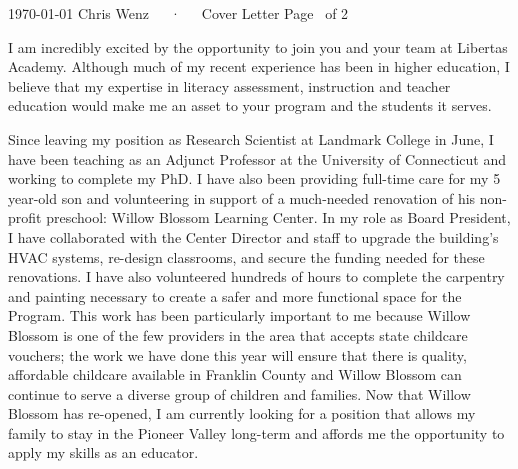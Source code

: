 \documentclass[11pt, a4paper]{awesome-cv}
\begin{document}
\makecvheader[C]

\makecvfooter
  {\today}
  {Chris Wenz~~~·~~~Cover Letter}
  {Page \thepage\ of 2}
\makelettertitle

\begin{cvletter}

I am incredibly excited by the opportunity to join you and your team at Libertas Academy. Although much of my recent experience has been in higher education, I believe that my expertise in literacy assessment, instruction and teacher education would make me an asset to your program and the students it serves.

Since leaving my position as Research Scientist at Landmark College in June, I have been teaching as an Adjunct Professor at the University of Connecticut and working to complete my PhD. I have also been providing full-time care for my 5 year-old son and volunteering in support of a much-needed renovation of his non-profit preschool: Willow Blossom Learning Center. In my role as Board President, I have collaborated with the Center Director and staff to upgrade the building's HVAC systems, re-design classrooms, and secure the funding needed for these renovations. I have also volunteered hundreds of hours to complete the carpentry and painting necessary to create a safer and more functional space for the Program. This work has been particularly important to me because Willow Blossom is one of the few providers in the area that accepts state childcare vouchers; the work we have done this year will ensure that there is quality, affordable childcare available in Franklin County and Willow Blossom can continue to serve a diverse group of children and families. Now that Willow Blossom has re-opened, I am currently looking for a position that allows my family to stay in the Pioneer Valley long-term and affords me the opportunity to apply my skills as an educator. 


\end{cvletter}
\end{document}

